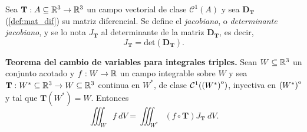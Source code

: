 \begin{definition}
    Sea $\mathbf{T}:A\subseteq\mathbb{R}^3\to\mathbb{R}^3$ un campo vectorial de clase  $\mathcal{C}^1(A)$ y sea $\boldsymbol{D}_\mathbf{T}$ (\autoref{def:mat_dif}) su matriz diferencial.  Se define el \emph{jacobiano}, o \emph{determinante jacobiano}, y se lo nota $J_\mathbf{T}$ al determinante de la matriz $\boldsymbol{D}_\mathbf{T}$, es decir,  
    \[
        J_\mathbf{T}=\text{det}(\boldsymbol{D}_\mathbf{T}).
    \]
\end{definition}





\begin{theorem}
\label{teo:cambio_variable}    
    \textbf{Teorema del cambio de variables para integrales triples.}  Sean $W \subseteq\mathbb{R}^3$ un conjunto acotado y  $f:W \to\mathbb{R}$ un campo integrable sobre $W$ y sea $\mathbf{T}:W^*\subseteq\mathbb{R}^3\to W\subseteq\mathbb{R}^3$ continua en $W^*$, de clase $\mathcal{C}^1({\kern0pt(W^*)}^{\mathrm{o}})$,  inyectiva en ${\kern0pt(W^*)}^{\mathrm{o}}$ y tal que $\mathbf{T}(W^*)=W$.  Entonces
    \[
        \iiint_W f\:dV=\iiint_{W^*}(f\circ\mathbf{T})J_\mathbf{T}\:dV.
    \]
\end{theorem}

